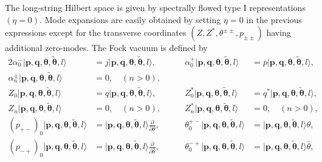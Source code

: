 \documentclass[a4paper,seceq,preprint]{ptptex}
\begin{document}
The long-string Hilbert space is given
by spectrally flowed type I representations 
$(\eta=0)$.\cite{KK} Mode expansions are 
easily obtained by setting $\eta=0$ in the previous 
expressions except for the transverse coordinates 
$(Z,Z^*,\theta^{\pm\pm},p_{\pm\pm})$ 
having additional zero-modes. 
The Fock vacuum is defined by
 \begin{alignat}{2}
   \alpha^-_0|\boldsymbol p,\boldsymbol q,\boldsymbol\theta,
\boldsymbol{\tilde\theta},l\rangle&=
j|\boldsymbol p,\boldsymbol q,\boldsymbol\theta,\boldsymbol{\tilde\theta}
,l\rangle,&\qquad
 \alpha^+_0|\boldsymbol p,\boldsymbol q,\boldsymbol\theta,
\boldsymbol{\tilde\theta},l\rangle&=p|\boldsymbol p,
\boldsymbol q,\boldsymbol\theta,\boldsymbol{\tilde\theta},l\rangle,
\nonumber\\
 \alpha^\pm_n|\boldsymbol p,\boldsymbol q,
\boldsymbol\theta,\boldsymbol{\tilde\theta}
,l\rangle&=0,\quad (n>0),&&\nonumber\\
 Z_0|\boldsymbol p,\boldsymbol q,
\boldsymbol\theta,\boldsymbol{\tilde\theta}
,l\rangle&=q|\boldsymbol p,\boldsymbol q,
\boldsymbol\theta,\boldsymbol{\tilde\theta},l\rangle,&\qquad
 Z^*_0|\boldsymbol p,\boldsymbol q,
\boldsymbol\theta,\boldsymbol{\tilde\theta}
,l\rangle&=q^*|\boldsymbol p,
\boldsymbol q,\boldsymbol\theta,\boldsymbol{\tilde\theta},l\rangle,
\nonumber\\
 Z_n|\boldsymbol p,\boldsymbol q,
\boldsymbol\theta,\boldsymbol{\tilde\theta}
,l\rangle&=0,\quad (n>0),&\qquad
 Z^*_n|\boldsymbol p,\boldsymbol q,
\boldsymbol\theta,\boldsymbol{\tilde\theta},l\rangle&=0,\quad (n>0),
\nonumber\\
 (p_{+-})_0|\boldsymbol p,\boldsymbol q,
\boldsymbol\theta,\boldsymbol{\tilde\theta},l\rangle&=
|\boldsymbol p,\boldsymbol q,
\boldsymbol\theta,\boldsymbol{\tilde\theta}
,l\rangle\frac{\partial}{\partial\theta},&\qquad
 \theta^{+-}_0|\boldsymbol p,\boldsymbol q,
\boldsymbol\theta,\boldsymbol{\tilde\theta}
,l\rangle&=|\boldsymbol p,\boldsymbol q,
\boldsymbol\theta,\boldsymbol{\tilde\theta},l\rangle\theta,
\nonumber\\
 (p_{-+})_0|\boldsymbol p,\boldsymbol q,
\boldsymbol\theta,\boldsymbol{\tilde\theta},l\rangle&=
|\boldsymbol p,\boldsymbol q,
\boldsymbol\theta,\boldsymbol{\tilde\theta}
,l\rangle\frac{\partial}{\partial\bar\theta},&\qquad
 \theta^{-+}_0|\boldsymbol p,\boldsymbol q,
\boldsymbol\theta,\boldsymbol{\tilde\theta}
,l\rangle&=|\boldsymbol p,\boldsymbol q,
\boldsymbol\theta,\boldsymbol{\tilde\theta},l\rangle\bar\theta,

\end{alignat}
\end{document}

